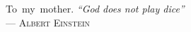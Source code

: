 \clearpage
\begin{flushright}
\mbox{To my mother.}\vfill
{\sffamily\itshape
``God does not play dice''\\}
--- \textsc{Albert Einstein}
\end{flushright}

